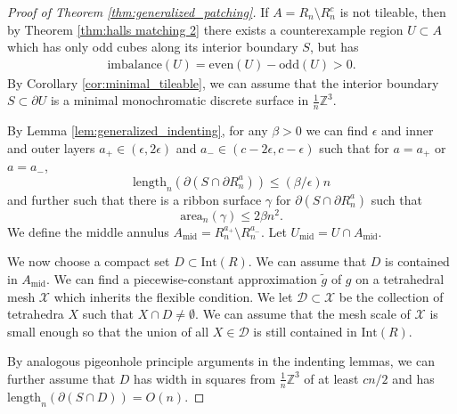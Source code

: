 \documentclass[10pt,a4paper]{amsart}
\newcommand{\m}[1]{\mathbb{#1}}
\newcommand{\mc}[1]{\mathcal{#1}}
\begin{document}
\begin{proof}[Proof of Theorem \ref{thm:generalized_patching}]
    If $A = R_n\setminus R_n^c$ is not tileable, then by Theorem \ref{thm:halls matching 2} there exists a counterexample region $U\subset A$ which has only odd cubes along its interior boundary $S$, but has 
    \begin{align*}
        \text{imbalance}(U) = \text{even}(U) - \text{odd}(U) > 0. 
    \end{align*}
    By Corollary \ref{cor:minimal_tileable}, we can assume that the interior boundary $S\subset \partial U$ is a minimal monochromatic discrete surface in $\frac{1}{n} \m Z^3$. 

    By Lemma \ref{lem:generalized_indenting}, for any $\beta>0$ we can find $\epsilon$ and inner and outer layers $a_+\in (\epsilon, 2\epsilon)$ and $a_-\in (c-2\epsilon, c-\epsilon)$ such that for $a=a_+$ or $a=a_-$,
    \begin{equation}\label{eq:length_generalized}
        \text{length}_n(\partial (S\cap \partial R_n^a)) \leq (\beta/\epsilon)n
    \end{equation}
    and further such that there is a ribbon surface $\gamma$ for $\partial (S\cap \partial R_n^a)$ such that 
    \begin{equation}\label{eq:ribbon}
        \text{area}_n(\gamma) \leq 2\beta n^2. 
    \end{equation}
    We define the middle annulus $A_{\text{mid}} = R_n^{a_+}\setminus R_n^{a_-}$. Let $U_{\text{mid}}=U\cap A_{\text{mid}}$. 
    
    We now choose a compact set $D\subset \text{Int}(R)$. We can assume that $D$ is contained in $A_{\text{mid}}$. We can find a piecewise-constant approximation $\widetilde g$ of $g$ on a tetrahedral mesh $\mc X$ which inherits the flexible condition. We let $\mc D\subset \mc X$ be the collection of tetrahedra $X$ such that $X\cap D\neq \emptyset$. We can assume that the mesh scale of $\mc X$ is small enough so that the union of all $X\in \mc D$ is still contained in $\text{Int}(R)$. 
        
    By analogous pigeonhole principle arguments in the indenting lemmas, we can further assume that $D$ has width in squares from $\frac{1}{n} \m Z^3$ of at least $cn/2$ and has $\text{length}_n(\partial (S\cap D)) = O(n)$.
    

\end{proof}
\end{document}
